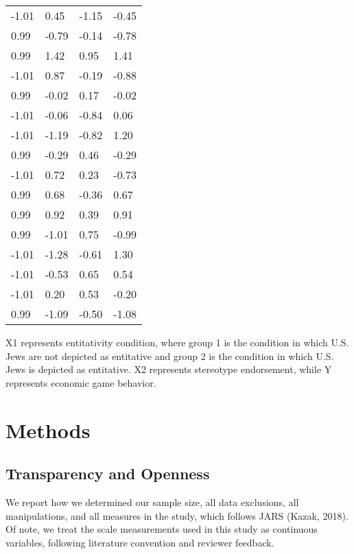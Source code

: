 \documentclass[
  doc,draftall]{apa6}
\begin{document}
\begin{table}[tbp]
\begin{center}
\begin{threeparttable}
\begin{tabular}{llll}
-1.01 & 0.45 & -1.15 & -0.45\\
0.99 & -0.79 & -0.14 & -0.78\\
0.99 & 1.42 & 0.95 & 1.41\\
-1.01 & 0.87 & -0.19 & -0.88\\
0.99 & -0.02 & 0.17 & -0.02\\
-1.01 & -0.06 & -0.84 & 0.06\\
-1.01 & -1.19 & -0.82 & 1.20\\
0.99 & -0.29 & 0.46 & -0.29\\
-1.01 & 0.72 & 0.23 & -0.73\\
0.99 & 0.68 & -0.36 & 0.67\\
0.99 & 0.92 & 0.39 & 0.91\\
0.99 & -1.01 & 0.75 & -0.99\\
-1.01 & -1.28 & -0.61 & 1.30\\
-1.01 & -0.53 & 0.65 & 0.54\\
-1.01 & 0.20 & 0.53 & -0.20\\
0.99 & -1.09 & -0.50 & -1.08\\
\bottomrule
\end{tabular}

\end{threeparttable}
\end{center}

\end{table}

X1 represents entitativity condition, where group 1 is the condition in which U.S. Jews are not depicted as entitative and group 2 is the condition in which U.S. Jews is depicted as entitative. X2 represents stereotype endorsement, while Y represents economic game behavior.

\section{Methods}\label{methods}

\subsection{Transparency and Openness}\label{transparency-and-openness}

We report how we determined our sample size, all data exclusions, all manipulations, and all measures in the study, which follows JARS (Kazak, 2018). Of note, we treat the scale measurements used in this study as continuous variables, following literature convention and reviewer feedback.
\end{document}
